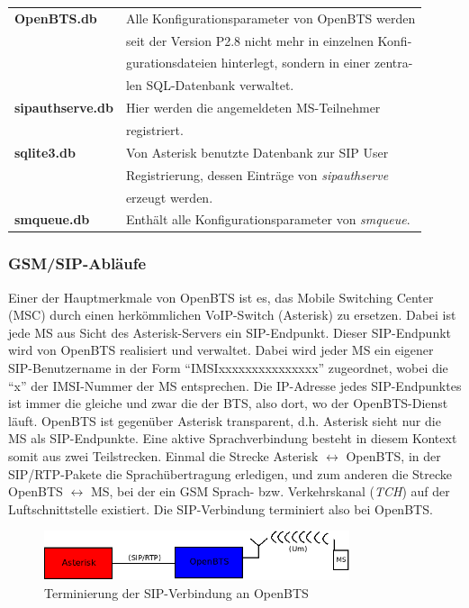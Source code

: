 \begin{table}[h]
	\centering
		\begin{tabular}{ll}
			\textbf{OpenBTS.db} & Alle Konfigurationsparameter von OpenBTS werden\\
			& seit der Version P2.8 nicht mehr in einzelnen Konfi-\\
			& gurationsdateien hinterlegt, sondern in einer zentra-\\
			& len SQL-Datenbank verwaltet.\\
			\textbf{sipauthserve.db} & Hier werden die angemeldeten MS-Teilnehmer\\
			& registriert.\\
			\textbf{sqlite3.db} & Von Asterisk benutzte Datenbank zur SIP User\\ 
			& Registrierung, dessen Einträge von \textit{sipauthserve}\\
			& erzeugt werden.\\
			 \textbf{smqueue.db} & Enthält alle Konfigurationsparameter von \textit{smqueue}.\\
		\end{tabular}
\end{table}

\subsubsection{GSM/SIP-Abläufe}
\label{gsmsip} 
Einer der Hauptmerkmale von OpenBTS ist es, das Mobile Switching Center (MSC) durch einen herkömmlichen VoIP-Switch (Asterisk) zu ersetzen. Dabei ist jede MS aus Sicht des Asterisk-Servers ein SIP-Endpunkt. Dieser SIP-Endpunkt wird von OpenBTS realisiert und verwaltet. Dabei wird jeder MS ein eigener SIP-Benutzername in der Form "`IMSIxxxxxxxxxxxxxxx"' zugeordnet, wobei die "`x"' der IMSI-Nummer der MS entsprechen. Die IP-Adresse jedes SIP-Endpunktes ist immer die gleiche und zwar die der BTS, also dort, wo der OpenBTS-Dienst läuft. OpenBTS ist gegenüber Asterisk transparent, d.h. Asterisk sieht nur die MS als SIP-Endpunkte. Eine aktive Sprachverbindung besteht in diesem Kontext somit aus zwei Teilstrecken. Einmal die Strecke Asterisk $ \longleftrightarrow $ OpenBTS, in der SIP/RTP-Pakete die Sprachübertragung erledigen, und zum anderen die Strecke OpenBTS $ \longleftrightarrow $ MS, bei der ein GSM Sprach- bzw. Verkehrskanal (\textit{TCH}) auf der Luftschnittstelle existiert. Die SIP-Verbindung terminiert also bei OpenBTS.
\begin{figure}[h]
	\centering
		\includegraphics[width=0.80\textwidth]{img/openbts_sip_asterisk.png}
	\caption{Terminierung der SIP-Verbindung an OpenBTS}
	\label{fig:openbts_sip_asterisk}
\end{figure}


